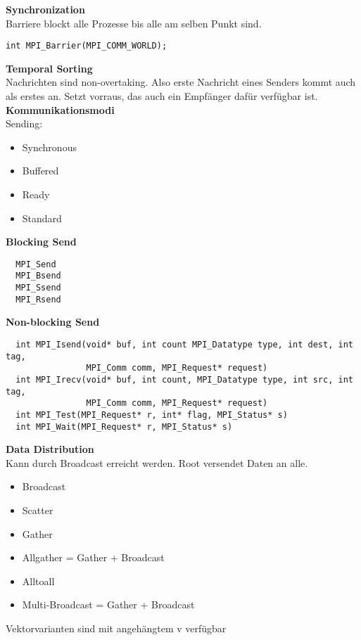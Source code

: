 \textbf{Synchronization}\\
Barriere blockt alle Prozesse bis alle am selben Punkt sind.
\begin{lstlisting}
int MPI_Barrier(MPI_COMM_WORLD);
\end{lstlisting}

\textbf{Temporal Sorting}\\
Nachrichten sind non-overtaking. Also erste Nachricht eines Senders kommt auch als erstes an. Setzt vorraus, das auch ein
Empfänger dafür verfügbar ist.\\

\textbf{Kommunikationsmodi}\\
Sending:
\begin{itemize}
  \item Synchronous
  \item Buffered
  \item Ready
  \item Standard
  \end{itemize}
  
\textbf{Blocking Send}
\begin{lstlisting}
  MPI_Send
  MPI_Bsend
  MPI_Ssend
  MPI_Rsend
\end{lstlisting}

\textbf{Non-blocking Send}
\begin{lstlisting}
  int MPI_Isend(void* buf, int count MPI_Datatype type, int dest, int tag, 
                MPI_Comm comm, MPI_Request* request)
  int MPI_Irecv(void* buf, int count, MPI_Datatype type, int src, int tag, 
                MPI_Comm comm, MPI_Request* request)
  int MPI_Test(MPI_Request* r, int* flag, MPI_Status* s)
  int MPI_Wait(MPI_Request* r, MPI_Status* s)
\end{lstlisting}

\textbf{Data Distribution}\\
Kann durch Broadcast erreicht werden. Root versendet Daten an alle.
\begin{itemize}
  \item Broadcast
  \item Scatter
  \item Gather
  \item Allgather = Gather + Broadcast
  \item Alltoall
  \item Multi-Broadcast = Gather + Broadcast
\end{itemize}
Vektorvarianten sind mit angehängtem v verfügbar\\

